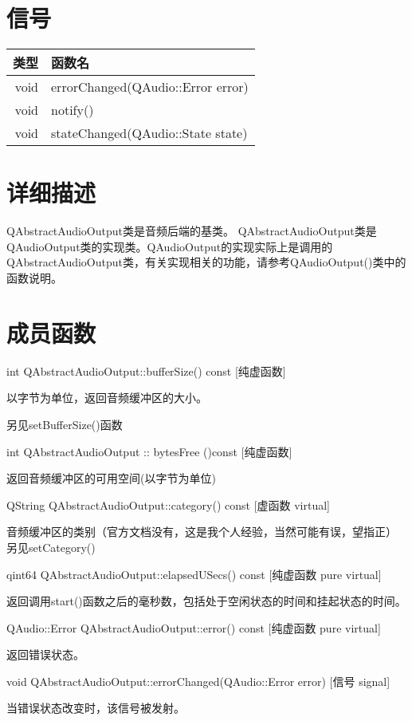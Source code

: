 \section{信号}

\begin{tabular}{|r|l|}
\hline
类型&函数名\\
\hline
void&	errorChanged(QAudio::Error error)\\
\hline
void&	notify()\\
\hline
void&	stateChanged(QAudio::State state)\\
\hline
\end{tabular}

\section{详细描述}

QAbstractAudioOutput类是音频后端的基类。 QAbstractAudioOutput类是
QAudioOutput类的实现类。QAudioOutput的实现实际上是调用的
QAbstractAudioOutput类，有关实现相关的功能，请参考QAudioOutput()类中的
函数说明。

\section{成员函数}

int QAbstractAudioOutput::bufferSize() const [纯虚函数] 

以字节为单位，返回音频缓冲区的大小。

另见setBufferSize()函数

int QAbstractAudioOutput :: bytesFree ()const [纯虚函数] 

返回音频缓冲区的可用空间(以字节为单位)

QString QAbstractAudioOutput::category() const [虚函数 virtual] 

音频缓冲区的类别（官方文档没有，这是我个人经验，当然可能有误，望指正） 另见setCategory()

qint64 QAbstractAudioOutput::elapsedUSecs() const [纯虚函数 pure
virtual] 

返回调用start()函数之后的毫秒数，包括处于空闲状态的时间和挂起状态的时间。

QAudio::Error QAbstractAudioOutput::error() const [纯虚函数 pure
virtual] 

返回错误状态。

void QAbstractAudioOutput::errorChanged(QAudio::Error error) [信号
signal] 

当错误状态改变时，该信号被发射。

